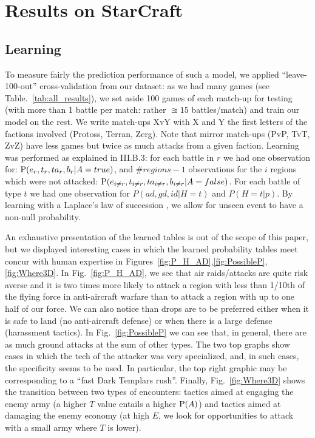 \section{Results on StarCraft}

\subsection{Learning}
To measure fairly the prediction performance of such a model, we applied ``leave-100-out'' cross-validation from our dataset: as we had many games (see Table.~\ref{tab:all_results}), we set aside 100 games of each match-up for testing (with more than 1 battle per match: rather $\approxeq 15$ battles/match) and train our model on the rest. We write match-ups XvY with X and Y the first letters of the factions involved (Protoss, Terran, Zerg). Note that mirror match-ups (PvP, TvT, ZvZ) have less games but twice as much attacks from a given faction. Learning was performed as explained in III.B.3: for each battle in $r$ we had one observation for: $\mathrm{P}(e_r,t_r,ta_r,b_r|A=true)$, and $\#regions-1$ observations for the $i$ regions which were not attacked: $\mathrm{P}(e_{i \neq r},t_{i \neq r}, ta_{i \neq r}, b_{i \neq r}|A=false)$. For each battle of type $t$ we had one observation for $P(ad,gd,id|H=t)$ and $P(H=t|p)$. By learning with a Laplace's law of succession \cite{Jaynes}, we allow for unseen event to have a non-null probability.

An exhaustive presentation of the learned tables is out of the scope of this paper, but we displayed interesting cases in which the learned probability tables meet concur with human expertise in Figures~\ref{fig:P_H_AD},\ref{fig:PossibleP},\ref{fig:Where3D}. In Fig.~\ref{fig:P_H_AD}, we see that air raids/attacks are quite risk averse and it is two times more likely to attack a region with less than 1/10th of the flying force in anti-aircraft warfare than to attack a region with up to one half of our force. We can also notice than drops are to be preferred either when it is safe to land (no anti-aircraft defense) or when there is a large defense (harassment tactics). In Fig.~\ref{fig:PossibleP} we can see that, in general, there are as much ground attacks at the sum of other types. The two top graphs show cases in which the tech of the attacker was very specialized, and, in such cases, the specificity seems to be used. In particular, the top right graphic may be corresponding to a ``fast Dark Templars rush''. Finally, Fig.~\ref{fig:Where3D} shows the transition between two types of encounters: tactics aimed at engaging the enemy army (a higher $T$ value entails a higher $\mathrm{P}(A)$) and tactics aimed at damaging the enemy economy (at high $E$, we look for opportunities to attack with a small army where $T$ is lower).

